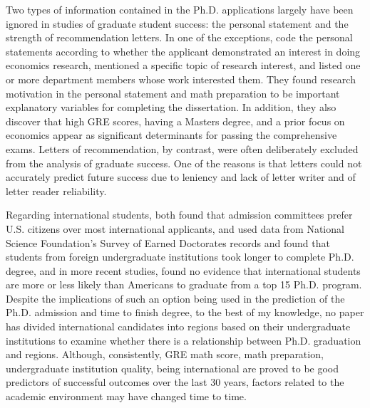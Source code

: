 \documentclass[12pt]{article}
\begin{document}
Two types of information contained in the Ph.D. applications largely have been ignored in studies of graduate student success: the personal statement and the strength of recommendation letters. In one of the exceptions, \citet{Dutkowsky2007} code the personal statements according to whether the applicant demonstrated an interest in doing economics research, mentioned a specific topic of research interest, and listed one or more department members whose work interested them.  They found research motivation in the personal statement and math preparation to be important explanatory variables for completing the dissertation. In addition, they also discover that high GRE scores, having a Masters degree, and a prior focus on economics appear as significant determinants for passing the comprehensive exams. Letters of recommendation, by contrast, were often deliberately excluded from the analysis of graduate success. One of the reasons is that letters could not accurately predict future success due to leniency \citep{letters1980} and lack of letter writer and of letter reader reliability.

Regarding international students, both \citet{Attiyeh1997TestingFB, wu2000} found that admission committees prefer U.S. citizens over most international applicants, and \citet{Tuckman1990} used data from National Science Foundation's Survey of Earned Doctorates records and found that students from foreign undergraduate institutions took longer to complete Ph.D. degree, and in more recent studies, \citet{pathtoeconphd,stock2014} found no evidence that international students are more or less likely than Americans to graduate from a top 15 Ph.D. program. Despite the implications of such an option being used in the prediction of the Ph.D. admission and time to finish degree, to the best of my knowledge, no paper has divided international candidates into regions based on their undergraduate institutions to examine whether there is a relationship between Ph.D. graduation and regions. Although, consistently, GRE math score, math preparation, undergraduate institution quality, being international are proved to be good predictors of successful outcomes over the last 30 years, factors related to the academic environment may have changed time to time.
\end{document}
